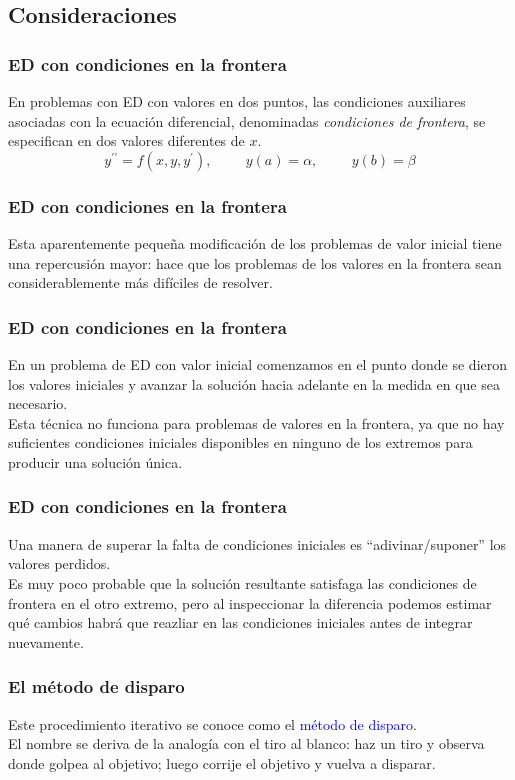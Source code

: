 \subsection{Consideraciones}
\begin{frame}
\frametitle{ED con condiciones en la frontera}
En problemas con ED con valores en dos puntos, las condiciones auxiliares asociadas con la ecuación diferencial, denominadas \emph{condiciones de frontera}, se especifican en dos valores diferentes de $x$.
\[  y^{\prime \prime} = f(x, y, y^{\prime}), \hspace{1cm} y(a) = \alpha, \hspace{1cm} y(b) = \beta \]
\end{frame}
\begin{frame}
\frametitle{ED con condiciones en la frontera}
Esta aparentemente pequeña modificación de los problemas de valor inicial tiene una repercusión mayor: hace que los problemas de los valores en la frontera sean considerablemente más difíciles de resolver.
\end{frame}
\begin{frame}
\frametitle{ED con condiciones en la frontera}
En un problema de ED con valor inicial comenzamos en el punto donde se dieron los valores iniciales y avanzar la solución hacia adelante en la medida en que sea necesario.
\\
\bigskip
Esta técnica no funciona para problemas de valores en la frontera, ya que no hay suficientes condiciones iniciales disponibles en ninguno de los extremos para producir una solución única.
\end{frame}
\begin{frame}
\frametitle{ED con condiciones en la frontera}
Una manera de superar la falta de condiciones iniciales es \enquote{adivinar/suponer} los valores perdidos.
\\
\bigskip
Es muy poco probable que la solución resultante satisfaga las condiciones de frontera en el otro extremo, pero al inspeccionar la diferencia podemos estimar qué cambios habrá que reazliar en las condiciones iniciales antes de integrar nuevamente.
\end{frame}
\begin{frame}
\frametitle{El método de disparo}
Este procedimiento iterativo se conoce como el \textcolor{blue}{método de disparo}. 
\\
\bigskip
El nombre se deriva de la analogía con el tiro al blanco: haz un tiro y observa donde golpea al objetivo; luego corrije el objetivo y vuelva a disparar.
\end{frame}

